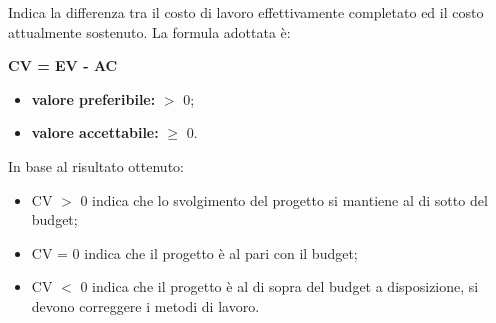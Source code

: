 Indica la differenza tra il costo di lavoro effettivamente completato ed il costo attualmente sostenuto.
La formula adottata è:
\begin{center}
	\textbf{CV = EV - AC}
\end{center}
\begin{itemize}
	\item \textbf{valore preferibile:} $>$ 0;
	\item \textbf{valore accettabile:} $\geq$ 0.
\end{itemize}
In base al risultato ottenuto:
\begin{itemize}
	\item CV $>$ 0 indica che lo svolgimento del progetto si mantiene al di sotto del budget;
	\item CV = 0 indica che il progetto è al pari con il budget;
	\item CV $<$ 0 indica che il progetto è al di sopra del budget a disposizione, si devono correggere i metodi di lavoro.
\end{itemize}